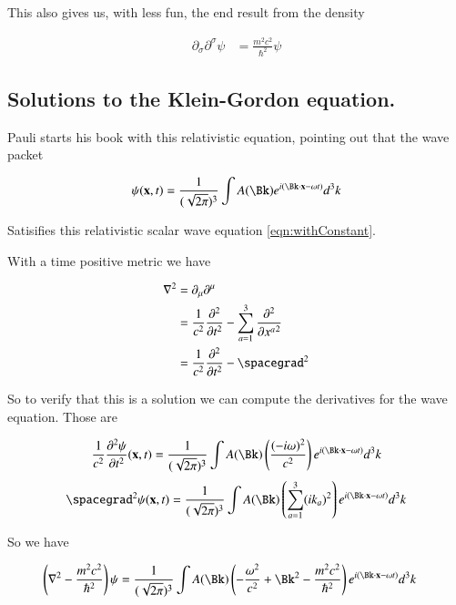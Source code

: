 \documentclass{article}
\newcommand{\PDSq}[2]{\frac{\partial^2 {#2}}{\partial {#1}^2}}
\begin{document}
This also gives us, with less fun, the end result from the density

\begin{align*}
\partial_\sigma \partial^\sigma \psi &= \frac{m^2 c^2}{\hbar^2}\psi 
\end{align*}

\subsection{ Solutions to the Klein-Gordon equation. }

Pauli starts his book \cite{pauli2000wm} with this relativistic equation, pointing out that the wave packet

\begin{align}
\psi(\Bx,t) = \inv{(\sqrt{2\pi})^3}\int A(\Bk) e^{ i (\Bk \cdot \Bx - \omega t)} d^3 k
\end{align}

Satisifies this relativistic scalar wave equation \ref{eqn:withConstant}.

With a time positive metric
we have

\begin{align*}
\grad^2 
&= \partial_\mu\partial^\mu \\
&= \inv{c^2} \PDSq{t}{} - \sum_{a=1}^3 \PDSq{x^a}{} \\
&= \inv{c^2} \PDSq{t}{} - \spacegrad^2
\end{align*}

So to verify that this is a solution we can compute the derivatives for the wave equation.  Those are

\begin{align*}
\inv{c^2} \PDSq{t} \psi(\Bx,t) = \inv{(\sqrt{2\pi})^3}\int A(\Bk) \left( \frac{(-i\omega)^2}{c^2} \right) e^{ i (\Bk \cdot \Bx - \omega t)} d^3 k
\end{align*}
\begin{align*}
\spacegrad^2 \psi(\Bx,t) = \inv{(\sqrt{2\pi})^3}\int A(\Bk) \left(\sum_{a=1}^3 (i k_a)^2 \right)e^{ i (\Bk \cdot \Bx - \omega t)} d^3 k
\end{align*}

So we have

\begin{align*}
\left( \grad^2 - \frac{m^2 c^2}{\hbar^2} \right) \psi 
&=
\inv{(\sqrt{2\pi})^3}\int A(\Bk) \left( -\frac{\omega^2}{c^2} + \Bk^2 - \frac{m^2 c^2}{\hbar^2}
\right)e^{ i (\Bk \cdot \Bx - \omega t)} d^3 k
\end{align*}
\end{document}
